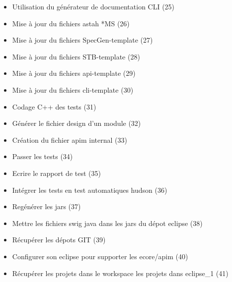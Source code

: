 \documentclass{article}
\begin{document}
\begin{itemize}
\item Utilisation du générateur de documentation CLI (25)
\item Mise à jour du fichiers astah *MS (26)
\item Mise à jour du fichiers SpecGen-template (27)
\item Mise à jour du fichiers STB-template (28)
\item Mise à jour du fichiers api-template (29)
\item Mise à jour du fichiers cli-template (30)
\item Codage C++ des tests (31)
\item Générer le fichier design d'un module (32)
\item Création du fichier apim internal (33)
\item Passer les tests (34)
\item Ecrire le rapport de test (35)
\item Intégrer les tests en test automatiques hudson (36)
\item Regénérer les jars (37)
\item Mettre les fichiers swig java dans les jars du dépot eclipse (38)
\item Récupérer les dépots GIT (39)
\item Configurer son eclipse pour supporter les ecore/apim (40)
\item Récupérer les projets dans le workspace les projets dans eclipse\_1 (41)
\end{itemize}
\end{document}
